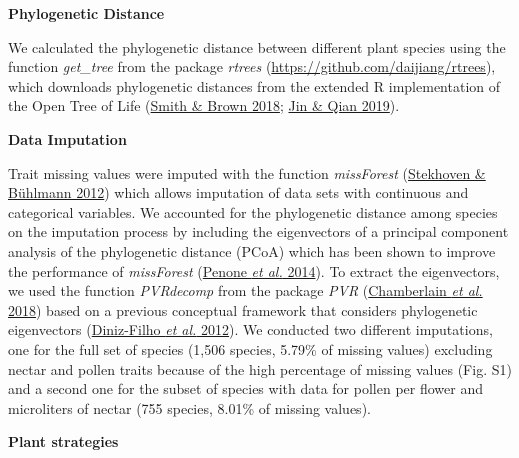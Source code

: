 \documentclass[
  12pt,
  a4paper,
]{article}
\begin{document}
\textbf{Phylogenetic Distance}

We calculated the phylogenetic distance between different plant species using the function \emph{get\_tree} from the package \emph{rtrees} (\url{https://github.com/daijiang/rtrees}), which downloads phylogenetic distances from the extended R implementation of the Open Tree of Life (\protect\hyperlink{ref-smith2018}{Smith \& Brown 2018}; \protect\hyperlink{ref-jin2019}{Jin \& Qian 2019}).

\textbf{Data Imputation}

Trait missing values were imputed with the function \emph{missForest} (\protect\hyperlink{ref-stekhoven2012}{Stekhoven \& Bühlmann 2012}) which allows imputation of data sets with continuous and categorical variables. We accounted for the phylogenetic distance among species on the imputation process by including the eigenvectors of a principal component analysis of the phylogenetic distance (PCoA) which has been shown to improve the performance of \emph{missForest} (\protect\hyperlink{ref-penone2014}{Penone \emph{et al.} 2014}). To extract the eigenvectors, we used the function \emph{PVRdecomp} from the package \emph{PVR} (\protect\hyperlink{ref-santos2018}{Chamberlain \emph{et al.} 2018}) based on a previous conceptual framework that considers phylogenetic eigenvectors (\protect\hyperlink{ref-diniz-filho2012}{Diniz-Filho \emph{et al.} 2012}). We conducted two different imputations, one for the full set of species (1,506 species, 5.79\% of missing values) excluding nectar and pollen traits because of the high percentage of missing values (Fig. S1) and a second one for the subset of species with data for pollen per flower and microliters of nectar (755 species, 8.01\% of missing values).

\textbf{Plant strategies}
\end{document}
